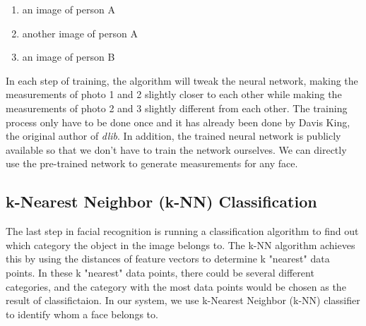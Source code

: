 \begin{enumerate}
  \item an image of person A
  \item another image of person A
  \item an image of person B
\end{enumerate}
\setstretch{\myContentLineSpacing}

In each step of training, the algorithm will tweak the neural network, making the measurements of photo 1 and 2
slightly closer to each other while making the measurements of photo 2 and 3 slightly different from each other.
The training process only have to be done once and it has already been done by Davis King, the original author of \emph{dlib}.
In addition, the trained neural network is publicly available so that we don't have to train the network ourselves.
We can directly use the pre-trained network to generate measurements for any face.

\subsection{k-Nearest Neighbor (k-NN) Classification}
The last step in facial recognition is running a classification algorithm to find out which category
the object in the image belongs to. The k-NN algorithm achieves this by using the distances of feature vectors
to determine k "nearest" data points. In these k "nearest" data points, there could be several different categories,
and the category with the most data points would be chosen as the result of classifictaion. In our system, we use
k-Nearest Neighbor (k-NN) classifier to identify whom a face belongs to.
